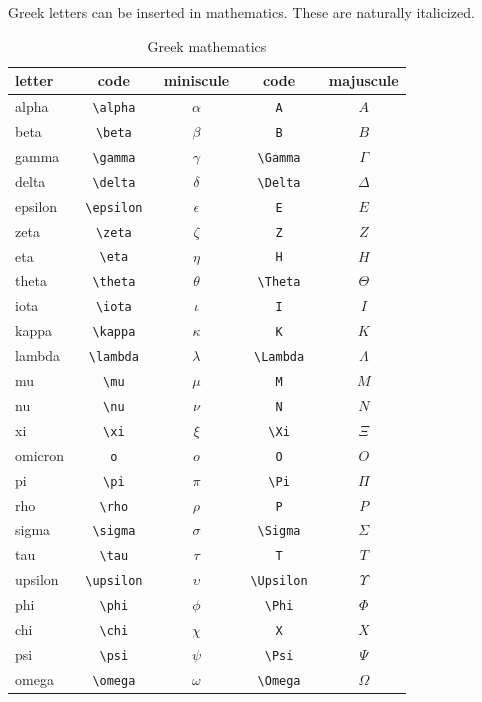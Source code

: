 Greek letters can be inserted in mathematics. These are naturally italicized.
\begin{longtable}[l]{lcccc}
    \caption{Greek mathematics} \label{tab:greek_mathematics} \\
    \toprule
    letter  & code & miniscule & code & majuscule \\
    \midrule
    \endhead %
    alpha   & \verb| \alpha |   & $\alpha$   & \verb| A |       & $A$ \\
    beta    & \verb| \beta |    & $\beta$    & \verb| B |       & $B$ \\
    gamma   & \verb| \gamma |   & $\gamma$   & \verb| \Gamma |  & $\Gamma$ \\
    delta   & \verb| \delta |   & $\delta$   & \verb| \Delta |  & $\Delta$ \\
    epsilon & \verb| \epsilon | & $\epsilon$ & \verb| E |       & $E$ \\
    zeta    & \verb| \zeta |    & $\zeta$    & \verb| Z |       & $Z$ \\
    eta     & \verb| \eta |     & $\eta$     & \verb| H |       & $H$ \\
    theta   & \verb| \theta |   & $\theta$   & \verb| \Theta |  & $\Theta$ \\
    iota    & \verb| \iota |    & $\iota$    & \verb| I |       & $I$ \\
    kappa   & \verb| \kappa |   & $\kappa$   & \verb| K |       & $K$ \\
    lambda  & \verb| \lambda |  & $\lambda$  & \verb| \Lambda | & $\Lambda$ \\
    mu      & \verb| \mu |      & $\mu$      & \verb| M |       & $M$ \\
    nu      & \verb| \nu |      & $\nu$      & \verb| N |       & $N$ \\
    xi      & \verb| \xi |      & $\xi$      & \verb| \Xi |     & $\Xi$ \\
    omicron & \verb| o |        & $o$        & \verb| O |       & $O$ \\
    pi      & \verb| \pi |      & $\pi$      & \verb| \Pi |     & $\Pi$ \\
    rho     & \verb| \rho |     & $\rho$     & \verb| P |       & $P$ \\
    sigma   & \verb| \sigma |   & $\sigma$   & \verb| \Sigma |  & $\Sigma$ \\
    tau     & \verb| \tau |     & $\tau$     & \verb| T |       & $T$ \\
    upsilon & \verb| \upsilon | & $\upsilon$ & \verb| \Upsilon |& $\Upsilon$ \\
    phi     & \verb| \phi |     & $\phi$     & \verb| \Phi |    & $\Phi$ \\
    chi     & \verb| \chi |     & $\chi$     & \verb| X |       & $X$ \\
    psi     & \verb| \psi |     & $\psi$     & \verb| \Psi |    & $\Psi$ \\
    omega   & \verb| \omega |   & $\omega$   & \verb| \Omega |  & $\Omega$ \\
    \bottomrule
\end{longtable}
